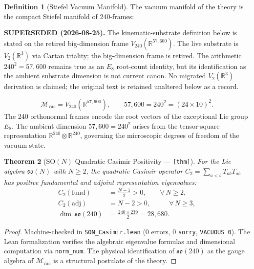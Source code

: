 \documentclass[12pt,letterpaper]{article}
\theoremstyle{plain}
\newtheorem{theorem}{Theorem}[section]
\theoremstyle{definition}
\newtheorem{definition}[theorem]{Definition}
\begin{document}
\begin{definition}[Stiefel Vacuum Manifold]\label{def:stiefel}
The vacuum manifold of the theory is the compact Stiefel manifold of 240-frames:

\vspace{2mm}\noindent\textbf{\color{gold}SUPERSEDED (2026-08-25).} The kinematic-substrate definition below is stated on the retired big-dimension frame $V_{240}(\mathbb{R}^{57{,}600})$. The live substrate is $V_2(\mathbb{R}^3)$ via Cartan triality; the big-dimension frame is retired. The arithmetic $240^2=57{,}600$ remains true as an $E_8$ root-count identity, but its identification as the ambient substrate dimension is not current canon. No migrated $V_2(\mathbb{R}^3)$ derivation is claimed; the original text is retained unaltered below as a record.\vspace{2mm}

\begin{equation}\label{eq:stiefel}
\mathcal{M}_{\mathrm{vac}} = V_{240}\!\left(\mathbb{R}^{57{,}600}\right),
  \qquad 57{,}600 = 240^2 = (24 \times 10)^2.
\end{equation}
The 240 orthonormal frames encode the root vectors of the exceptional Lie group $E_8$. The ambient dimension $57{,}600 = 240^2$ arises from the tensor-square representation $\mathbb{R}^{240} \otimes \mathbb{R}^{240}$, governing the microscopic degrees of freedom of the vacuum state.
\end{definition}

\begin{theorem}[$\mathrm{SO}(N)$ Quadratic Casimir Positivity --- {\normalfont\texttt{[thm]}}]
\label{thm:casimir}
For the Lie algebra $\mathfrak{so}(N)$ with $N \ge 2$, the quadratic Casimir operator $C_2 = \sum_{a<b} T_{ab} T_{ab}$ has positive fundamental and adjoint representation eigenvalues:
\begin{align}
  C_2(\mathrm{fund}) &= \frac{N-1}{2} > 0, \qquad \forall\, N \ge 2, \label{eq:casimir_fund}\\
  C_2(\mathrm{adj})  &= N - 2 > 0, \qquad\;\;\, \forall\, N \ge 3, \label{eq:casimir_adj}\\
  \dim\,\mathfrak{so}(240) &= \frac{240 \times 239}{2} = 28{,}680. \label{eq:dim_so240}
\end{align}
\end{theorem}

\begin{proof}
Machine-checked in \texttt{SON\_Casimir.lean} (0 errors, 0 \texttt{sorry}, \texttt{VACUOUS\,0}). The Lean formalization verifies the algebraic eigenvalue formulas and dimensional computation via \texttt{norm\_num}. The physical identification of $\mathfrak{so}(240)$ as the gauge algebra of $\mathcal{M}_{\mathrm{vac}}$ is a structural postulate of the theory.
\end{proof}
\end{document}
